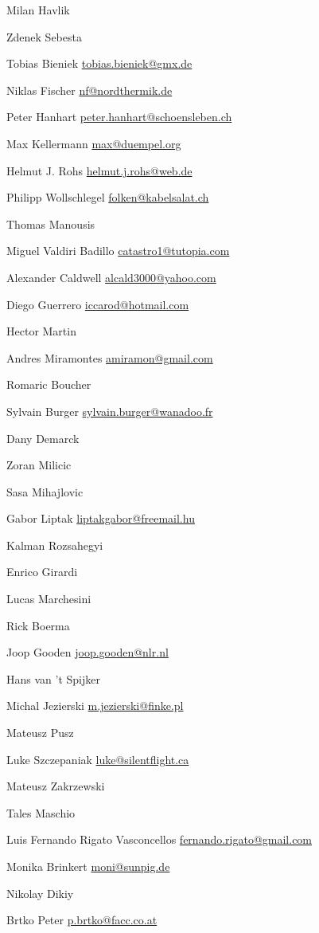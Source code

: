 \item Milan Havlik
\item*Zdenek Sebesta
\item Tobias Bieniek \url{tobias.bieniek@gmx.de}
\item Niklas Fischer \url{nf@nordthermik.de}
\item Peter Hanhart \url{peter.hanhart@schoensleben.ch}
\item Max Kellermann \url{max@duempel.org}
\item Helmut J. Rohs \url{helmut.j.rohs@web.de}
\item Philipp Wollschlegel \url{folken@kabelsalat.ch}
\item*Thomas Manousis
\item Miguel Valdiri Badillo \url{catastro1@tutopia.com}
\item Alexander Caldwell \url{alcald3000@yahoo.com}
\item Diego Guerrero \url{iccarod@hotmail.com}
\item*Hector Martin
\item Andres Miramontes \url{amiramon@gmail.com}
\item*Romaric Boucher
\item Sylvain Burger \url{sylvain.burger@wanadoo.fr}
\item*Dany Demarck
\item*Zoran Milicic
\item*Sasa Mihajlovic
\item Gabor Liptak \url{liptakgabor@freemail.hu}
\item*Kalman Rozsahegyi
\item*Enrico Girardi
\item*Lucas Marchesini
\item*Rick Boerma
\item Joop Gooden \url{joop.gooden@nlr.nl}
\item Hans van 't Spijker
\item Michal Jezierski \url{m.jezierski@finke.pl}
\item*Mateusz Pusz
\item Luke Szczepaniak \url{luke@silentflight.ca}
\item Mateusz Zakrzewski
\item*Tales Maschio
\item Luis Fernando Rigato Vasconcellos \url{fernando.rigato@gmail.com}
\item Monika Brinkert \url{moni@sunpig.de}
\item Nikolay Dikiy
\item Brtko Peter \url{p.brtko@facc.co.at}
